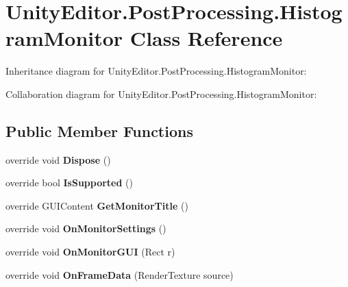 \hypertarget{class_unity_editor_1_1_post_processing_1_1_histogram_monitor}{}\section{Unity\+Editor.\+Post\+Processing.\+Histogram\+Monitor Class Reference}
\label{class_unity_editor_1_1_post_processing_1_1_histogram_monitor}


Inheritance diagram for Unity\+Editor.\+Post\+Processing.\+Histogram\+Monitor\+:


Collaboration diagram for Unity\+Editor.\+Post\+Processing.\+Histogram\+Monitor\+:
\subsection*{Public Member Functions}
\begin{DoxyCompactItemize}
\item 
\mbox{\label{class_unity_editor_1_1_post_processing_1_1_histogram_monitor_a9240b5721430577251b39b7070c14ed4}} 
override void {\bfseries Dispose} ()
\item 
\mbox{\label{class_unity_editor_1_1_post_processing_1_1_histogram_monitor_a63e9ff70b84ba8443d2429359a103b02}} 
override bool {\bfseries Is\+Supported} ()
\item 
\mbox{\label{class_unity_editor_1_1_post_processing_1_1_histogram_monitor_ac727fbd3d56355c5a3b03f47ec230cb2}} 
override G\+U\+I\+Content {\bfseries Get\+Monitor\+Title} ()
\item 
\mbox{\label{class_unity_editor_1_1_post_processing_1_1_histogram_monitor_aa9ca26fe0daab044d6871dfb423bbbbf}} 
override void {\bfseries On\+Monitor\+Settings} ()
\item 
\mbox{\label{class_unity_editor_1_1_post_processing_1_1_histogram_monitor_a587ac5ca6c538b090329c9cd7dafca39}} 
override void {\bfseries On\+Monitor\+G\+UI} (Rect r)
\item 
\mbox{\label{class_unity_editor_1_1_post_processing_1_1_histogram_monitor_ae33e556cd3f2386e34562c9cda059da6}} 
override void {\bfseries On\+Frame\+Data} (Render\+Texture source)
\end{DoxyCompactItemize}
